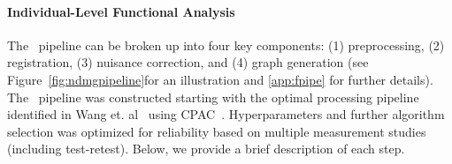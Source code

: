 \documentclass[11pt]{article}
\begin{document}
\begin{multicols}{2}
\paragraph{Individual-Level Functional Analysis}

The \ndmgf~pipeline can be broken up into four key components: (1) preprocessing, (2) registration, (3) nuisance correction, and (4) graph generation (see Figure~\ref{fig:ndmgpipeline}for an illustration and  \ref{app:fpipe} for further details).
The \ndmgf~pipeline was constructed starting with the optimal processing pipeline identified in Wang et. al~\cite{discriminability} using CPAC~\cite{cpac}. Hyperparameters and further algorithm selection was optimized for reliability based on multiple measurement studies (including test-retest).
Below, we provide a brief description of each step.


\end{multicols}
\end{document}
